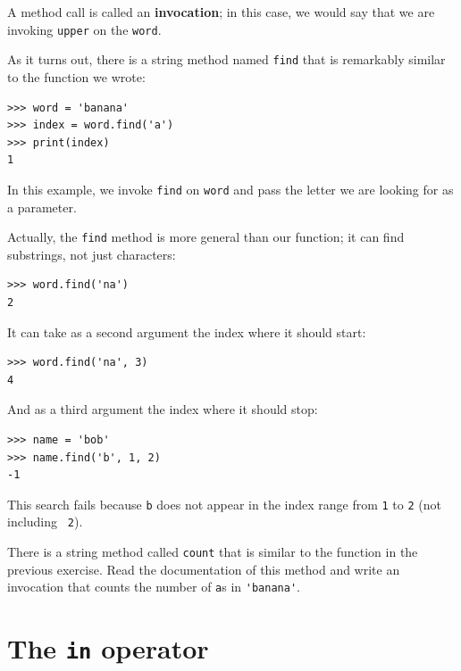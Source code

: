 \documentclass[10pt]{book}
\begin{document}

A method call is called an {\bf invocation}; in this case, we would
say that we are invoking {\tt upper} on the {\tt word}.


As it turns out, there is a string method named {\tt find} that
is remarkably similar to the function we wrote:

\beforeverb
\begin{verbatim}
>>> word = 'banana'
>>> index = word.find('a')
>>> print(index)
1
\end{verbatim}
\afterverb
%
In this example, we invoke {\tt find} on {\tt word} and pass
the letter we are looking for as a parameter.

Actually, the {\tt find} method is more general than our function;
it can find substrings, not just characters:

\beforeverb
\begin{verbatim}
>>> word.find('na')
2
\end{verbatim}
\afterverb
%
It can take as a second argument the index where it should start:


\beforeverb
\begin{verbatim}
>>> word.find('na', 3)
4
\end{verbatim}
\afterverb
%
And as a third argument the index where it should stop:

\beforeverb
\begin{verbatim}
>>> name = 'bob'
>>> name.find('b', 1, 2)
-1
\end{verbatim}
\afterverb
%
This search fails because {\tt b} does not
appear in the index range from {\tt 1} to {\tt 2} (not including {\tt
2}).


\begin{ex}

There is a string method called {\tt count} that is similar
to the function in the previous exercise.  Read the documentation
of this method
and write an invocation that counts the number of {\tt a}s
in \verb"'banana'".
\end{ex}


\section{The {\tt in} operator}
\label{inboth}
\end{document}

